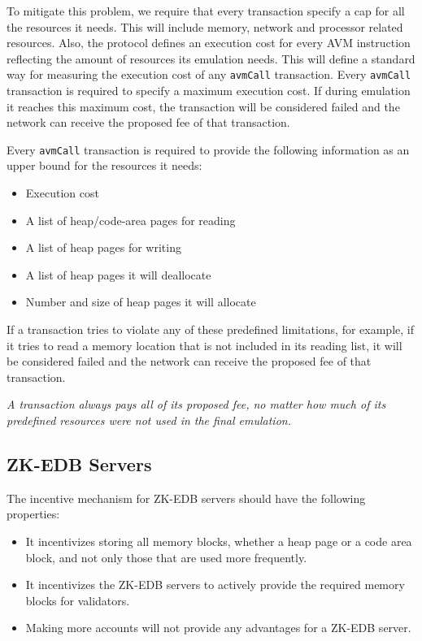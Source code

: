 \documentclass[11pt, A4]{report}
\begin{document}
    To mitigate this problem, we require that every transaction specify a cap for all the resources it needs. This
    will include memory, network and processor related resources. Also, the protocol defines an execution cost for
    every AVM instruction reflecting the amount of resources its emulation needs. This will define a standard way for
    measuring the execution cost of any \texttt{avmCall} transaction. Every \texttt{avmCall} transaction is required
    to specify a maximum execution cost. If during emulation it reaches this maximum cost, the transaction will be
    considered failed and the network can receive the proposed fee of that transaction.

    Every \texttt{avmCall} transaction is required to provide the following information as an upper bound for the
    resources it needs:

    \begin{itemize}
        \item Execution cost
        \item A list of heap/code-area pages for reading
        \item A list of heap pages for writing
        \item A list of heap pages it will deallocate
        \item Number and size of heap pages it will allocate
    \end{itemize}

    If a transaction tries to violate any of these predefined limitations, for example, if it tries to read a memory
    location that is not included in its reading list, it will be considered failed and the network can receive the
    proposed fee of that transaction.

    \emph{A transaction always pays all of its proposed fee, no matter how much of its predefined resources were not
    used in the final emulation.}

    \subsection{ZK-EDB Servers}\label{subsec:zk-edb-servers}

    The incentive mechanism for ZK-EDB servers should have the following properties:

    \begin{itemize}
        \item It incentivizes storing all memory blocks, whether a heap page or a code area block, and not only those
        that are used more frequently.
        \item It incentivizes the ZK-EDB servers to actively provide the required memory blocks for validators.
        \item Making more accounts will not provide any advantages for a ZK-EDB server.
    \end{itemize}
\end{document}
